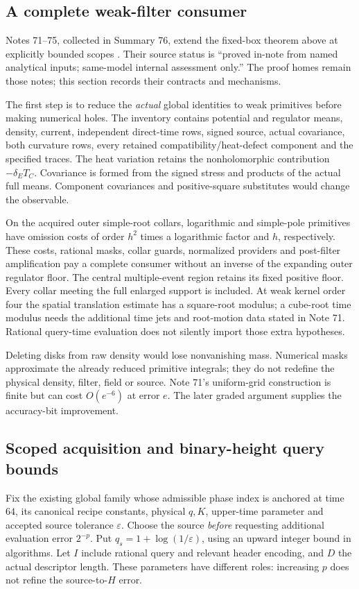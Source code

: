 \subsection{A complete weak-filter consumer}
Notes 71--75, collected in Summary 76, extend the fixed-box theorem
above at explicitly bounded scopes \cite{weak-consumer,graded-cost,
binary-p,all-height-cost,binary-g,summary76}. Their source status is
``proved in-note from named analytical inputs; same-model internal
assessment only.'' The proof homes remain those notes; this section
records their contracts and mechanisms.

The first step is to reduce the \emph{actual} global identities to weak
primitives before making numerical holes. The inventory contains
potential and regulator means, density, current, independent direct-time
rows, signed source, actual covariance, both curvature rows, every
retained compatibility/heat-defect component and the specified traces.
The heat variation retains the nonholomorphic contribution
$-\delta_E T_C$. Covariance is formed from the signed stress and products
of the actual full means. Component covariances and positive-square
substitutes would change the observable.

On the acquired outer simple-root collars, logarithmic and simple-pole
primitives have omission costs of order $h^2$ times a logarithmic factor
and $h$, respectively. These costs, rational masks, collar guards,
normalized providers and post-filter amplification pay a complete
consumer without an inverse of the expanding outer regulator floor.
The central multiple-event region retains its fixed positive floor.
Every collar meeting the full enlarged support is included. At weak
kernel order four the spatial translation estimate has a square-root
modulus; a cube-root time modulus needs the additional time jets and
root-motion data stated in Note 71. Rational query-time evaluation does
not silently import those extra hypotheses.

Deleting disks from raw density would lose nonvanishing mass. Numerical
masks approximate the already reduced primitive integrals; they do not
redefine the physical density, filter, field or source. Note 71's
uniform-grid construction is finite but can cost $O(e^{-6})$ at error
$e$. The later graded argument supplies the accuracy-bit improvement.

\subsection{Scoped acquisition and binary-height query bounds}
Fix the existing global family whose admissible phase index is anchored
at time $64$, its canonical recipe constants, physical $q,K$, upper-time
parameter and accepted source tolerance $\varepsilon$. Choose the source
\emph{before} requesting additional evaluation error $2^{-p}$. Put
$q_s=1+\log(1/\varepsilon)$, using an upward integer bound in algorithms.
Let $I$ include rational query and relevant header encoding, and $D$ the
actual descriptor length. These parameters have different roles:
increasing $p$ does not refine the source-to-$H$ error.

